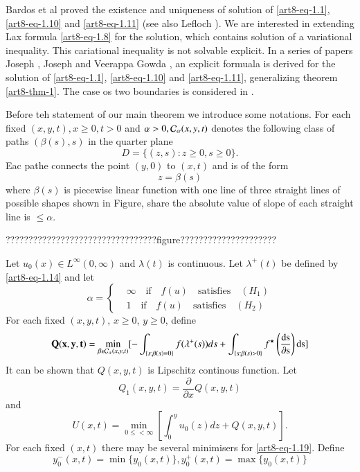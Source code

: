 Bardos et al \cite{art8-key1} proved the existence and uniqueness of solution of \eqref{art8-eq-1.1}, \eqref{art8-eq-1.10} and \eqref{art8-eq-1.11} (see also Lefloch \cite{art8-key10}). We are interested in extending Lax formula \eqref{art8-eq-1.8} for the solution, which contains solution of a variational inequality. This cariational inequality is not solvable explicit. In a series of papers Joseph \cite{art8-key3}, Joseph and Veerappa Gowda
\cite{art8-key4, art8-key5}, an explicit formuala is derived for the solution of \eqref{art8-eq-1.1}, \eqref{art8-eq-1.10}
and \eqref{art8-eq-1.11}, generalizing theorem \ref{art8-thm-1}. The case os two boundaries is considered in
\cite{art8-key6}.

Before teh statement of our main theorem we introduce some notations. For each fixed $(x,y,t),x \geq 0, t > 0$ and $\alpha > 0, \mathcal{C}_{\alpha}(x,y,t)$ denotes the following class of paths $(\beta(s), s)$ in the quarter plane
$$
D = \{(z,s): z\geq 0, s \geq 0\}.
$$
Eac pathe connects the point $(y,0)$ to $(x,t)$ and is of the form
$$
z=\beta(s)
$$
where $\beta(s)$ is piecewise linear function with one line of three straight lines of possible shapes shown in Figure, share the absolute value of slope of each straight line is $\leq \alpha$.

\begin{center}
?????????????????????????????????figure?????????????????????
\end{center}
 Let $u_{0}(x)\in L^{\infty}(0,\infty)$ and $\lambda(t)$ is continuous. Let $\lambda^{+}(t)$ be defined by
 \eqref{art8-eq-1.14} and let
 \begin{equation}\label{art8-eq-1.16}
 \alpha =\left\{
 \begin{aligned}
&\infty \quad\text{if}\quad f(u)\quad \text{satisfies}\quad (H_{1})\\
&1\quad  \text{if}\quad f(u)\quad \text{satisfies}\quad (H_{2})
 \end{aligned}
\right.
 \end{equation}
For each fixed $(x,y,t)$, $x \geq 0$, $y\geq 0$, define
\begin{equation}\label{art8-eq-1.17}
\mathbf{Q}(\mathbf{x}, \mathbf{y}, \mathbf{t}) = \min\limits_{\beta \epsilon \mathcal{C}_{\alpha}(x,y,t)}[-\int_{\{s:\beta(s)=0\}} f(\lambda^{+}(s))ds + \int_{\{s:\beta(s)>0\}}f^{\star}\left(\dfrac{\rm{ds}}{\partial{\rm s}}\right){\rm ds}]
\end{equation}
It can be shown that $Q(x,y,t)$ is Lipschitz continous function. Let
\begin{equation}\label{art8-eq-1.18}
Q_{1}(x,y,t)= \dfrac{\partial}{\partial x}Q(x,y,t)
\end{equation} 
and
\begin{equation}\label{art8-eq-1.19}
U(x, t) = \min\limits_{0 \leq < \infty}\left[\int_{0}^{y}u_{0}(z)dz + Q(x,y,t)\right].
\end{equation}
For each fixed $(x,t)$ there may be several minimisers for \eqref{art8-eq-1.19}. Define
\begin{equation}\label{art8-eq-1.20}
y_{0}^{-}(x, t) =\min\{y_{0}(x,t)\}, y_{0}^{+}(x,t)=\max\{y_{0}(x,t)\}
\end{equation}

